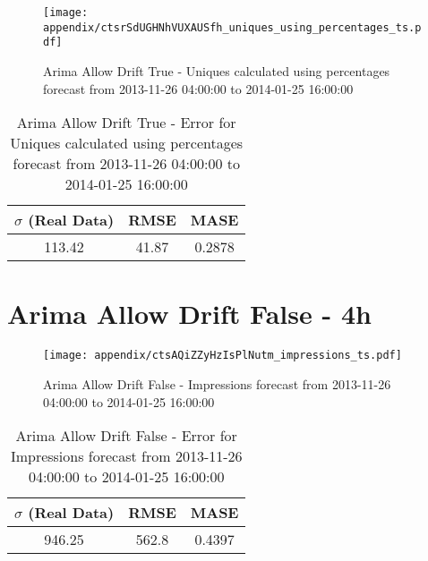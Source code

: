 \begin{figure}[H] \begin{center} \leavevmode
\texttt{[image: appendix/ctsrSdUGHNhVUXAUSfh\_uniques\_using\_percentages\_ts.pdf]} \caption[]{
Arima Allow Drift True - Uniques calculated using percentages forecast from 2013-11-26 04:00:00 to 2014-01-25 16:00:00} \label{fig:appendix/ctsrSdUGHNhVUXAUSfh_uniques_using_percentages_ts.pdf} \end{center}
\end{figure}

\begin{table}[H]
\centering
\footnotesize
\begin{tabular}{ccc}
$\sigma$ (Real Data) & RMSE & MASE   \\ \hline
113.42 & 41.87 & 0.2878 \\
\end{tabular}

\vspace{0.5cm}

\caption[]{
Arima Allow Drift True - Error for Uniques calculated using percentages forecast from 2013-11-26 04:00:00 to 2014-01-25 16:00:00}
\end{table}

\section{Arima Allow Drift False - 4h}
\begin{figure}[H] \begin{center} \leavevmode
\texttt{[image: appendix/ctsAQiZZyHzIsPlNutm\_impressions\_ts.pdf]} \caption[]{
Arima Allow Drift False - Impressions forecast from 2013-11-26 04:00:00 to 2014-01-25 16:00:00} \label{fig:appendix/ctsAQiZZyHzIsPlNutm_impressions_ts.pdf} \end{center}
\end{figure}

\begin{table}[H]
\centering
\footnotesize
\begin{tabular}{ccc}
$\sigma$ (Real Data) & RMSE & MASE   \\ \hline
946.25 & 562.8 & 0.4397 \\
\end{tabular}

\vspace{0.5cm}

\caption[]{
Arima Allow Drift False - Error for Impressions forecast from 2013-11-26 04:00:00 to 2014-01-25 16:00:00}
\end{table}

